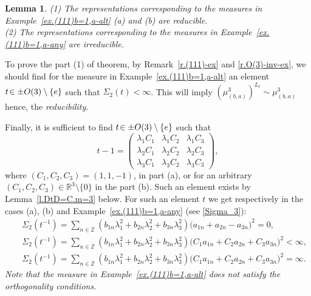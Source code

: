 \documentclass[preprint,12pt]{elsarticle}
\newtheorem{lem}[thm]{Lemma}
\numberwithin{equation}{section}
\begin{document}
%
\begin{lem}
(1) The representations corresponding to the measures in  Example~\ref{ex.(111)b=1,a-alt} (a) and (b) are reducible.\\
(2) The representations corresponding to the measures in  Example~\ref{ex.(111)b=1,a-any}  are irreducible.
\end{lem}
%
\begin{pf}
To prove the  part (1) of theorem, by Remark~\ref{r.(111)-ex} and \eqref{r.O(3)-inv-ex},
we should find for the measure 
in  Example~\ref{ex.(111)b=1,a-alt} an element
$t\!\in \pm{\rm O}(3)\setminus\{e\}$ 
such that $\Sigma_2(t)\!<\!\infty$. 
This will imply  $(\mu_{(b,a)}^3)^{L_t}\sim\mu_{(b,a)}^3$ hence, the {\it reducibility}.

%
Finally,
it is sufficient to find
$t\!\in \pm{\rm O}(3)\setminus\{e\}$ 
 such that 
\begin{equation}
\label{t-1}
t-1=\left(\begin{smallmatrix}
\lambda_1C_1 &\lambda_1C_2 &\lambda_1C_3 \\
\lambda_2C_1 &\lambda_2C_2 &\lambda_2C_3 \\
\lambda_3C_1 &\lambda_3C_2 &\lambda_3C_3
\end{smallmatrix}
\right),
\end{equation}
where $(C_1,C_2,C_3)=(1,1,-1)$, in  part (a), or for an arbitrary $(C_1,C_2,C_3)\in {\mathbb R}^3\setminus\{0\}$ in the part (b).
Such an element exists by Lemma~\ref{l.DtD=C.m=3} below. 
For such an element  $t$ we get 
respectively in the cases (a), (b) and  Example~\ref{ex.(111)b=1,a-any} 
(see \eqref{Sigma_3}):
%
\begin{eqnarray}
\nonumber
 &&
 \Sigma_2(t^{-1})=\sum_{n\in{\mathbb Z}}(b_{1n}\lambda_1^2+b_{2n}\lambda_2^2+b_{3n}\lambda_3^2)\big(a_{1n}+a_{2n}-a_{3n}\big)^2=0,\\
\nonumber
 &&
\Sigma_2(t^{-1})
%
=\sum_{n\in{\mathbb Z}}(b_{1n}\lambda_1^2+b_{2n}\lambda_2^2+b_{3n}\lambda_3^2)\big(C_1a_{1n}+C_2a_{2n}+C_3a_{3n}\big)^2<\infty,\\
\label{(111)(111)}
&&
\Sigma_2(t^{-1})\!=\!\sum_{n\in{\mathbb Z}}(b_{1n}\lambda_1^2\!+\!b_{2n}\lambda_2^2\!+\!b_{3n}\lambda_3^2)\big(C_1a_{1n}\!+\!C_2a_{2n}\!+\!C_3a_{3n}\big)^2\!=\!\infty.
\end{eqnarray}
{\it Note that the measure in Example~\ref{ex.(111)b=1,a-alt} does not satisfy the  orthogonality conditions}.
%



\end{pf}
\end{document}
